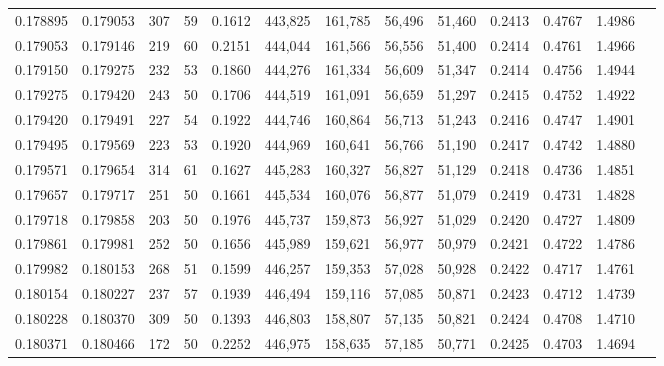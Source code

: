 \begin{tabular}{rrrrrrrrrrrrr}
0.178895 & 0.179053 &   307 &  59 &                                     0.1612 & 443,825 & 161,785 &  56,496 &  51,460 & 0.2413 & 0.4767 & 1.4986 \\
0.179053 & 0.179146 &   219 &  60 &                                     0.2151 & 444,044 & 161,566 &  56,556 &  51,400 & 0.2414 & 0.4761 & 1.4966 \\
0.179150 & 0.179275 &   232 &  53 &                                     0.1860 & 444,276 & 161,334 &  56,609 &  51,347 & 0.2414 & 0.4756 & 1.4944 \\
0.179275 & 0.179420 &   243 &  50 &                                     0.1706 & 444,519 & 161,091 &  56,659 &  51,297 & 0.2415 & 0.4752 & 1.4922 \\
0.179420 & 0.179491 &   227 &  54 &                                     0.1922 & 444,746 & 160,864 &  56,713 &  51,243 & 0.2416 & 0.4747 & 1.4901 \\
0.179495 & 0.179569 &   223 &  53 &                                     0.1920 & 444,969 & 160,641 &  56,766 &  51,190 & 0.2417 & 0.4742 & 1.4880 \\
0.179571 & 0.179654 &   314 &  61 &                                     0.1627 & 445,283 & 160,327 &  56,827 &  51,129 & 0.2418 & 0.4736 & 1.4851 \\
0.179657 & 0.179717 &   251 &  50 &                                     0.1661 & 445,534 & 160,076 &  56,877 &  51,079 & 0.2419 & 0.4731 & 1.4828 \\
0.179718 & 0.179858 &   203 &  50 &                                     0.1976 & 445,737 & 159,873 &  56,927 &  51,029 & 0.2420 & 0.4727 & 1.4809 \\
0.179861 & 0.179981 &   252 &  50 &                                     0.1656 & 445,989 & 159,621 &  56,977 &  50,979 & 0.2421 & 0.4722 & 1.4786 \\
0.179982 & 0.180153 &   268 &  51 &                                     0.1599 & 446,257 & 159,353 &  57,028 &  50,928 & 0.2422 & 0.4717 & 1.4761 \\
0.180154 & 0.180227 &   237 &  57 &                                     0.1939 & 446,494 & 159,116 &  57,085 &  50,871 & 0.2423 & 0.4712 & 1.4739 \\
0.180228 & 0.180370 &   309 &  50 &                                     0.1393 & 446,803 & 158,807 &  57,135 &  50,821 & 0.2424 & 0.4708 & 1.4710 \\
0.180371 & 0.180466 &   172 &  50 &                                     0.2252 & 446,975 & 158,635 &  57,185 &  50,771 & 0.2425 & 0.4703 & 1.4694 \\

\end{tabular}
